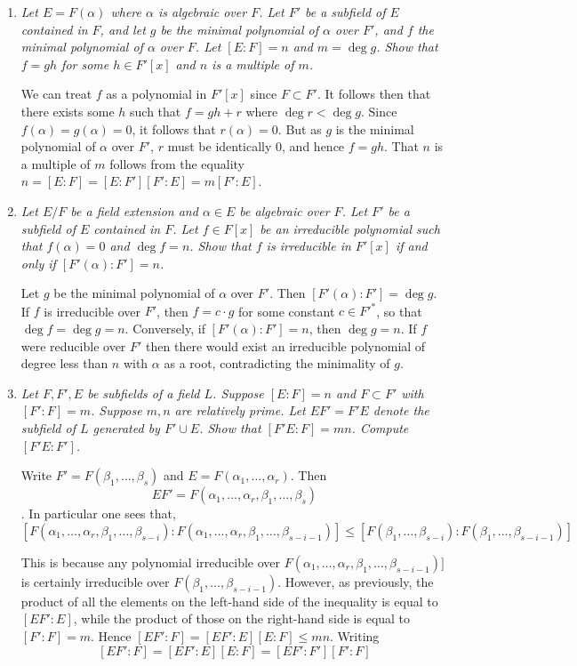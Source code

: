 \documentclass[10pt]{article}
\begin{document}
\begin{enumerate}
\item \emph{Let $E = F(\alpha)$ where $\alpha$ is algebraic over $F$.  Let $F'$ be a subfield of $E$ contained in $F$, and let $g$ be the minimal polynomial of $\alpha$ over $F'$, and $f$ the minimal polynomial of $\alpha$ over $F$.  Let $[E:F] = n$ and $m = \deg g$.  Show that $f = gh$ for some $h \in F'[x]$ and $n$ is a multiple of $m$.}

We can treat $f$ as a polynomial in $F'[x]$ since $F \subset F'$.  It follows then that there exists some $h$ such that $f = gh + r$ where $\deg r < \deg g$.  Since $f(\alpha) = g(\alpha) = 0$, it follows that $r(\alpha) = 0$.  But as $g$ is the minimal polynomial of $\alpha$ over $F'$, $r$ must be identically $0$, and hence $f = gh$.  That $n$ is a multiple of $m$ follows from the equality $n = [E:F] = [E:F'][F':E] = m[F':E]$.

\item \emph{Let $E/F$ be a field extension and $\alpha \in E$ be algebraic over $F$.  Let $F'$ be a subfield of $E$ contained in $F$.  Let $f \in F[x]$ be an irreducible polynomial such that $f(\alpha) = 0$ and $\deg f = n$.  Show that $f$ is irreducible in $F'[x]$ if and only if $[F'(\alpha) : F'] = n$.}

Let $g$ be the minimal polynomial of $\alpha$ over $F'$.  Then $[F'(\alpha) : F'] =  \deg g$.  If $f$ is irreducible over $F'$, then $f = c \cdot g$ for some constant $c \in F'^\ast$, so that $\deg f = \deg g = n$.  Conversely, if $[F'(\alpha) : F'] = n$, then $\deg g = n$.  If $f$ were reducible over $F'$ then there would exist an irreducible polynomial of degree less than $n$ with $\alpha$ as a root, contradicting the minimality of $g$.

\item \emph{Let $F, F', E$ be subfields of a field $L$.  Suppose $[E:F] = n$ and $F \subset F'$ with $[F': F] = m$.  Suppose $m,n$ are relatively prime.  Let $EF'=F'E$ denote the subfield of $L$ generated by $F' \cup E$.  Show that $[F'E: F] = mn$.  Compute $[F'E: F']$.}

Write $F' = F(\beta_1, \ldots, \beta_s)$ and $E=F(\alpha_1, \ldots, \alpha_r)$.  Then $$EF' = F(\alpha_1, \ldots, \alpha_r, \beta_1, \ldots, \beta_s)$$.  In particular one sees that,
\[
[F(\alpha_1, \ldots, \alpha_r, \beta_1, \ldots, \beta_{s-i}):F(\alpha_1, \ldots, \alpha_r, \beta_1, \ldots, \beta_{s-i-1})] \leq [F(\beta_1, \ldots, \beta_{s-i}) : F(\beta_1, \ldots, \beta_{s-i-1})]
\]

This is because any polynomial irreducible over $F(\alpha_1, \ldots, \alpha_r, \beta_1, \ldots, \beta_{s-i-1})]$ is certainly irreducible over $F(\beta_1, \ldots, \beta_{s-i-1})$.  However, as previously, the product of all the elements on the left-hand side of the inequality is equal to $[EF':E]$, while the product of those on the right-hand side is equal to $[F':F] = m$.  Hence $[EF':F] = [EF':E][E:F] \leq mn$.  Writing 
\[
[EF':F] = [EF':E][E:F] = [EF':F'][F':F]
\]


\end{enumerate}
\end{document}
